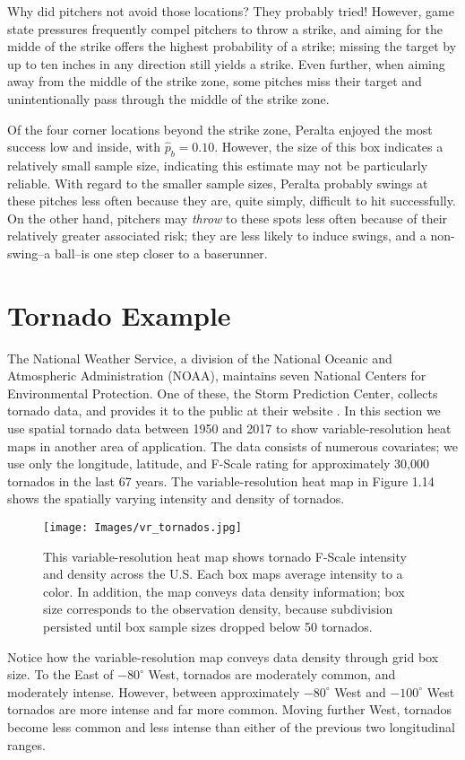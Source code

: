 Why did pitchers not avoid those locations? They probably tried! However, game state pressures frequently compel pitchers to throw a strike, and aiming for the midde of the strike offers the highest probability of a strike; missing the target by up to ten inches in any direction still yields a strike. Even further, when aiming away from the middle of the strike zone, some pitches miss their target and unintentionally pass through the middle of the strike zone. 

Of the four corner locations beyond the strike zone, Peralta enjoyed the most success low and inside, with $\hat{p}_{b} = 0.10$. However, the size of this box indicates a relatively small sample size, indicating this estimate may not be particularly reliable. With regard to the smaller sample sizes, Peralta probably swings at these pitches less often because they are, quite simply, difficult to hit successfully. On the other hand, pitchers may {\it throw} to these spots less often because of their relatively greater associated risk; they are less likely to induce swings, and a non-swing--a ball--is one step closer to a baserunner. 


\section{Tornado Example}

The National Weather Service, a division of the National Oceanic and Atmospheric Administration (NOAA), maintains seven National Centers for Environmental Protection. One of these, the Storm Prediction Center, collects tornado data, and provides it to the public at their website \citep{NOAA}. In this section we use spatial tornado data between 1950 and 2017 to show variable-resolution heat maps in another area of application. The data consists of numerous covariates; we use only the longitude, latitude, and F-Scale rating for approximately 30,000 tornados in the last 67 years. The variable-resolution heat map in Figure 1.14 shows the spatially varying intensity and density of tornados.
        \begin{figure}[H]
      	\centering      
      	\texttt{[image: Images/vr\_tornados.jpg]}
      	\caption{This variable-resolution heat map shows tornado F-Scale intensity and density across the U.S. Each box maps average intensity to a color. In addition, the map conveys data density information; box size corresponds to the observation density, because subdivision persisted until box sample sizes dropped below 50 tornados.}
        \end{figure}
Notice how the variable-resolution map conveys data density through grid box size. To the East of $-80^{\circ}$ West, tornados are moderately common, and moderately intense. However, between approximately $-80^{\circ}$ West and $-100^{\circ}$ West tornados are more intense and far more common. Moving further West, tornados become less common and less intense than either of the previous two longitudinal ranges.




% 
% 
% 
% 